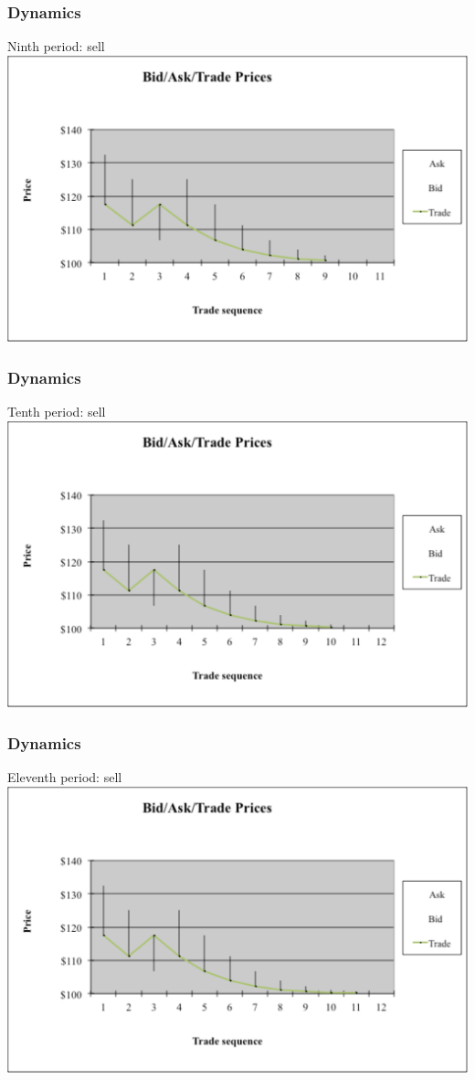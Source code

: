 \begin{frame} [noframenumbering]
	\frametitle{Dynamics}
	Ninth period: sell
	\center
	\includegraphics[width=0.9\linewidth]{pics/P9_Image.pdf}
\end{frame}


\begin{frame} [noframenumbering]
	\frametitle{Dynamics}
	Tenth period: sell
	\center
	\includegraphics[width=0.9\linewidth]{pics/P10_Image.pdf}
\end{frame}


\begin{frame} [noframenumbering]
	\frametitle{Dynamics}
	Eleventh period: sell
	\center
	\includegraphics[width=0.9\linewidth]{pics/P11_Image.pdf}
\end{frame}


